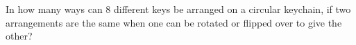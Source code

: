 In how many ways can $8$ different keys be arranged on a circular keychain, if two arrangements are the same when one can be rotated or flipped over to give the other?
